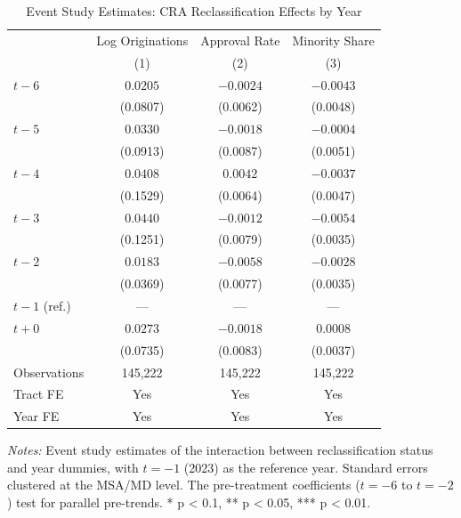 \begin{table}[htbp]
\centering
\caption{Event Study Estimates: CRA Reclassification Effects by Year}
\label{tab:eventstudy}
\begin{threeparttable}
\begin{tabular}{lccc}
\toprule
 & Log Originations & Approval Rate & Minority Share \\
 & (1) & (2) & (3) \\
\midrule
$t -6$ & $0.0205$ & $-0.0024$ & $-0.0043$ \\
 & (0.0807) & (0.0062) & (0.0048) \\[3pt]
$t -5$ & $0.0330$ & $-0.0018$ & $-0.0004$ \\
 & (0.0913) & (0.0087) & (0.0051) \\[3pt]
$t -4$ & $0.0408$ & $0.0042$ & $-0.0037$ \\
 & (0.1529) & (0.0064) & (0.0047) \\[3pt]
$t -3$ & $0.0440$ & $-0.0012$ & $-0.0054$ \\
 & (0.1251) & (0.0079) & (0.0035) \\[3pt]
$t -2$ & $0.0183$ & $-0.0058$ & $-0.0028$ \\
 & (0.0369) & (0.0077) & (0.0035) \\[3pt]
$t -1$ (ref.) & --- & --- & --- \\[3pt]
$t +0$ & $0.0273$ & $-0.0018$ & $0.0008$ \\
 & (0.0735) & (0.0083) & (0.0037) \\[3pt]
\midrule
Observations & 145,222 & 145,222 & 145,222 \\
Tract FE & Yes & Yes & Yes \\
Year FE & Yes & Yes & Yes \\
\bottomrule
\end{tabular}
\begin{tablenotes}[flushleft]
\small
\item \textit{Notes:} Event study estimates of the interaction between reclassification status and year dummies, with $t = -1$ (2023) as the reference year. Standard errors clustered at the MSA/MD level. The pre-treatment coefficients ($t = -6$ to $t = -2$) test for parallel pre-trends. * p < 0.1, ** p < 0.05, *** p < 0.01.
\end{tablenotes}
\end{threeparttable}
\end{table}
